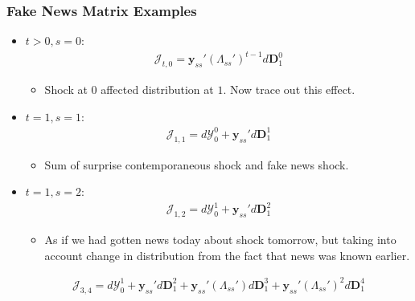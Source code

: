 \documentclass[english,xcolor=svgnames]{beamer}
\begin{document}
\begin{frame}
    \frametitle{Fake News Matrix Examples}
    \begin{itemize}
        \item $t>0,s=0$:
        \begin{align*}
        	\mathcal{J}_{t,0} = \bm{y}_{ss}'(\Lambda_{ss}')^{t-1} d\bm{D}_1^0
        \end{align*}
        \begin{itemize}
        	\item Shock at $0$ affected distribution at $1$. Now trace out this effect.
        \end{itemize}
       	\item $t=1,s=1$:
        \begin{align*}
        	\mathcal{J}_{1,1} = d\mathcal{Y}_0^0 + \bm{y}_{ss}' d\bm{D}_1^1
        \end{align*}
        \begin{itemize}
        	\item Sum of surprise contemporaneous shock and fake news shock.
        \end{itemize}
        \item $t=1,s=2$:
        \begin{align*}
        	\mathcal{J}_{1,2} = d\mathcal{Y}_0^1 + \bm{y}_{ss}' d\bm{D}_1^2
        \end{align*}
        \begin{itemize}
        	\item As if we had gotten news today about shock tomorrow, but taking into account change in distribution from the fact that news was known earlier.
        \end{itemize}
        \begin{align*}
        	\mathcal{J}_{3,4} = d\mathcal{Y}_0^1 + \bm{y}_{ss}'  d\bm{D}_1^2 + \bm{y}_{ss}' (\Lambda_{ss}') d\bm{D}_1^3 + \bm{y}_{ss}' (\Lambda_{ss}')^{2} d\bm{D}_1^4
        \end{align*}
	\end{itemize}
\end{frame}
\end{document}
